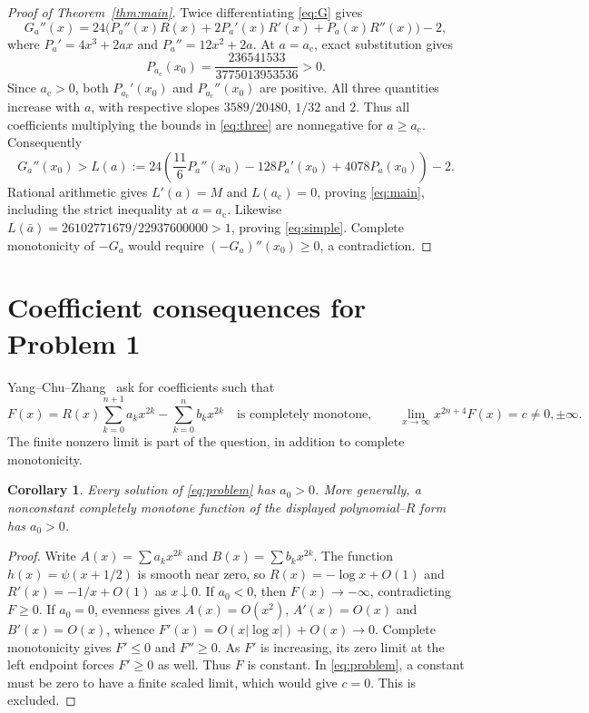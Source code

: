 \documentclass[11pt]{article}
\newtheorem{corollary}[theorem]{Corollary}
\newcommand{\ac}{a_{\mathrm c}}
\newcommand{\ab}{\bar a}
\begin{document}
\begin{proof}[Proof of Theorem~\ref{thm:main}]
Twice differentiating \eqref{eq:G} gives
\begin{equation}
G_a''(x)=24\bigl(P_a''(x)R(x)+2P_a'(x)R'(x)
+P_a(x)R''(x)\bigr)-2,\label{eq:derivative}
\end{equation}
where $P_a'=4x^3+2ax$ and $P_a''=12x^2+2a$.
At $a=\ac$, exact substitution gives
\[
P_{\ac}(x_0)=\frac{236541533}{3775013953536}>0.
\]
Since $\ac>0$, both $P_{\ac}'(x_0)$ and $P_{\ac}''(x_0)$ are
positive. All three quantities increase with $a$, with respective
slopes $3589/20480$, $1/32$ and $2$.
Thus all coefficients multiplying the bounds in \eqref{eq:three}
are nonnegative for $a\geq\ac$. Consequently
\[
G_a''(x_0)>L(a):=
24\left(\frac{11}{6}P_a''(x_0)-128P_a'(x_0)
+4078P_a(x_0)\right)-2.
\]
Rational arithmetic gives $L'(a)=M$ and $L(\ac)=0$, proving
\eqref{eq:main}, including the strict inequality at $a=\ac$.
Likewise $L(\ab)=26102771679/22937600000>1$, proving
\eqref{eq:simple}. Complete monotonicity of $-G_a$ would require
$(-G_a)''(x_0)\geq0$, a contradiction.
\end{proof}

\section{Coefficient consequences for Problem 1}
Yang--Chu--Zhang~\cite[Problem~1, p.~16]{ycz} ask for coefficients such that
\begin{equation}
F(x)=R(x)\sum_{k=0}^{n+1}a_kx^{2k}-\sum_{k=0}^{n}b_kx^{2k}
\quad\text{is completely monotone},\qquad
\lim_{x\to\infty}x^{2n+4}F(x)=c\ne0,\pm\infty.
\label{eq:problem}
\end{equation}
The finite nonzero limit is part of the question, in addition to
complete monotonicity.

\begin{corollary}\label{cor:constant}
Every solution of \eqref{eq:problem} has $a_0>0$.
More generally, a nonconstant completely monotone function of the
displayed polynomial--$R$ form has $a_0>0$.
\end{corollary}
\begin{proof}
Write $A(x)=\sum a_kx^{2k}$ and $B(x)=\sum b_kx^{2k}$.
The function $h(x)=\psi(x+1/2)$ is smooth near zero, so
$R(x)=-\log x+O(1)$ and $R'(x)=-1/x+O(1)$ as $x\downarrow0$.
If $a_0<0$, then $F(x)\to-\infty$, contradicting $F\geq0$.
If $a_0=0$, evenness gives $A(x)=O(x^2)$, $A'(x)=O(x)$ and
$B'(x)=O(x)$, whence $F'(x)=O(x|\log x|)+O(x)\to0$.
Complete monotonicity gives $F'\leq0$ and $F''\geq0$.
As $F'$ is increasing, its zero limit at the left endpoint forces
$F'\geq0$ as well. Thus $F$ is constant.
In \eqref{eq:problem}, a constant must be zero to have a finite scaled
limit, which would give $c=0$. This is excluded.
\end{proof}
\end{document}
